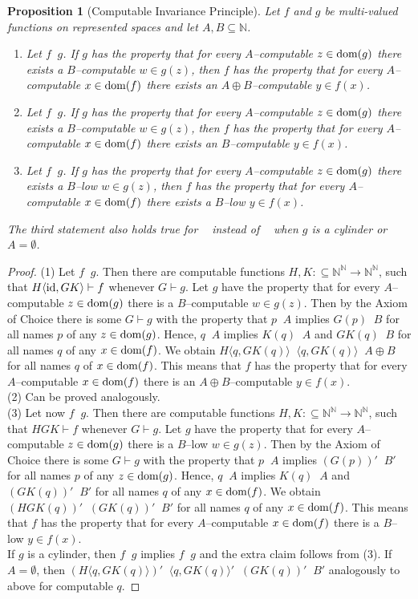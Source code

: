 \documentclass[a4paper]{amsart}
\def\IN{{\mathbb{N}}}
\def\In{\subseteq}
\def\id{{\rm id}}
\def\dom{{\rm dom}}
\def\Baire{{\IN^\IN}}
\def\leqT{\mathop{\leq_{\mathrm{T}}}}
\def\leqW{\mathop{\leq_{\mathrm{W}}}}
\def\leqSW{\mathop{\leq_{\mathrm{sW}}}}
\newtheorem{proposition}[theorem]{Proposition}
\theoremstyle{definition}
\begin{document}
\begin{proposition}[Computable Invariance Principle]
\label{prop:computable-invariance}
Let $f$ and $g$ be multi-valued functions on represented spaces
and let $A,B\In\IN$. 
\begin{enumerate}
\item 
Let $f\leqW g$. If $g$ has the property that for every $A$--computable $z\in\dom(g)$ there exists a $B$--computable
$w\in g(z)$, then $f$ has the property that for every $A$--computable $x\in\dom(f)$
there exists an $A\oplus B$--computable $y\in f(x)$.
\item 
Let $f\leqSW g$. If $g$ has the property that for every $A$--computable $z\in\dom(g)$ there exists a $B$--computable
$w\in g(z)$, then $f$ has the property that for every $A$--computable $x\in\dom(f)$
there exists an $B$--computable $y\in f(x)$.
\item 
Let $f\leqSW g$. If $g$ has the property that for every $A$--computable $z\in\dom(g)$ there exists a $B$--low
$w\in g(z)$, then $f$ has the property that for every $A$--computable $x\in\dom(f)$
there exists a $B$--low $y\in f(x)$.
\end{enumerate}
The third statement also holds true for $\leqW$ instead of $\leqSW$ when $g$ is a cylinder
or $A=\emptyset$.
\end{proposition}
\begin{proof}
(1)
Let $f\leqW g$. Then there are computable functions $H,K:\In\Baire\to\Baire$, such that 
$H\langle\id,GK\rangle\vdash f$ whenever $G\vdash g$.
Let $g$ have the property that for every $A$--computable $z\in\dom(g)$ there is a $B$--computable $w\in g(z)$.
Then by the Axiom of Choice there is some $G\vdash g$ with the property that 
$p\leqT A$ implies $G(p)\leqT B$ for all names $p$ of any $z\in\dom(g)$. 
Hence, $q\leqT A$ implies $K(q)\leqT A$ and $GK(q)\leqT B$ for all names $q$ of any $x\in\dom(f)$.
We obtain $H\langle q,GK(q)\rangle\leqT\langle q,GK(q)\rangle\leqT A\oplus B$ for all names $q$ of $x\in\dom(f)$.
This means that $f$ has the property that for every $A$--computable $x\in\dom(f)$ there is an $A\oplus B$--computable $y\in f(x)$.\\
(2) Can be proved analogously.\\
(3) 
Let now $f\leqSW g$.  Then there are computable functions $H,K:\In\Baire\to\Baire$, such that 
$HGK\vdash f$ whenever $G\vdash g$.
Let $g$ have the property that for every $A$--computable $z\in\dom(g)$ there is a $B$--low $w\in g(z)$.
Then by the Axiom of Choice there is some $G\vdash g$ with the property that 
$p\leqT A$ implies $(G(p))'\leqT B'$ for all names $p$ of any $z\in\dom(g)$. 
Hence, $q\leqT A$ implies $K(q)\leqT A$ and $(GK(q))'\leqT B'$ for all names $q$ of any $x\in\dom(f)$.
We obtain $(HGK(q))'\leqT (GK(q))'\leqT B'$ for all names $q$ of any $x\in\dom(f)$.
This means that $f$ has the property that for every $A$--computable $x\in\dom(f)$ there is a $B$--low $y\in f(x)$.\\
If $g$ is a cylinder, then $f\leqW g$ implies $f\leqSW g$ and the extra claim follows from (3).
If $A=\emptyset$, then
$(H\langle q,GK(q)\rangle)'\leqT\langle q,GK(q)\rangle'\leqT (GK(q))'\leqT B'$ analogously to above for computable $q$.
\end{proof}
\end{document}
